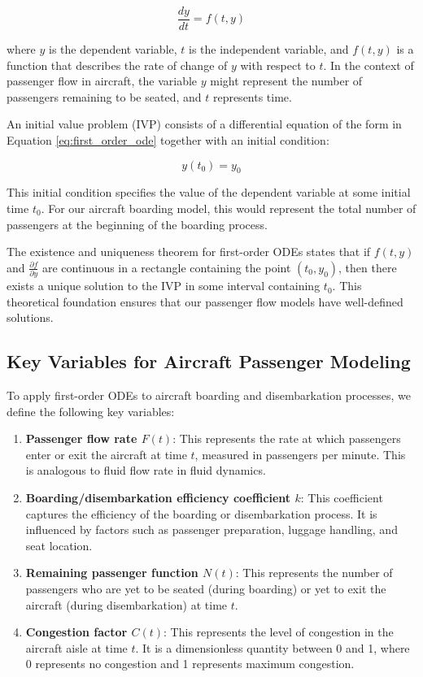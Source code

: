 \documentclass[12pt,a4paper]{article}
\begin{document}
\begin{equation}
\frac{dy}{dt} = f(t, y)
\label{eq:first_order_ode}
\end{equation}

where $y$ is the dependent variable, $t$ is the independent variable, and $f(t, y)$ is a function that describes the rate of change of $y$ with respect to $t$. In the context of passenger flow in aircraft, the variable $y$ might represent the number of passengers remaining to be seated, and $t$ represents time.

An initial value problem (IVP) consists of a differential equation of the form in Equation \ref{eq:first_order_ode} together with an initial condition:

\begin{equation}
y(t_0) = y_0
\label{eq:ivp}
\end{equation}

This initial condition specifies the value of the dependent variable at some initial time $t_0$. For our aircraft boarding model, this would represent the total number of passengers at the beginning of the boarding process.

The existence and uniqueness theorem for first-order ODEs states that if $f(t, y)$ and $\frac{\partial f}{\partial y}$ are continuous in a rectangle containing the point $(t_0, y_0)$, then there exists a unique solution to the IVP in some interval containing $t_0$. This theoretical foundation ensures that our passenger flow models have well-defined solutions.

\subsection{Key Variables for Aircraft Passenger Modeling}

To apply first-order ODEs to aircraft boarding and disembarkation processes, we define the following key variables:

\begin{enumerate}
    \item \textbf{Passenger flow rate $F(t)$}: This represents the rate at which passengers enter or exit the aircraft at time $t$, measured in passengers per minute. This is analogous to fluid flow rate in fluid dynamics.
    
    \item \textbf{Boarding/disembarkation efficiency coefficient $k$}: This coefficient captures the efficiency of the boarding or disembarkation process. It is influenced by factors such as passenger preparation, luggage handling, and seat location.
    
    \item \textbf{Remaining passenger function $N(t)$}: This represents the number of passengers who are yet to be seated (during boarding) or yet to exit the aircraft (during disembarkation) at time $t$.
    
    \item \textbf{Congestion factor $C(t)$}: This represents the level of congestion in the aircraft aisle at time $t$. It is a dimensionless quantity between 0 and 1, where 0 represents no congestion and 1 represents maximum congestion.
\end{enumerate}
\end{document}
